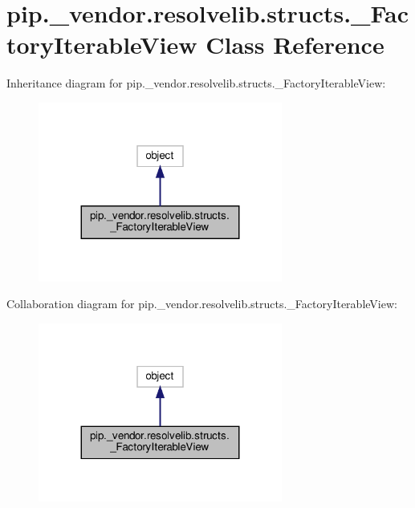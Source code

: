 \hypertarget{classpip_1_1__vendor_1_1resolvelib_1_1structs_1_1__FactoryIterableView}{}\section{pip.\+\_\+vendor.\+resolvelib.\+structs.\+\_\+\+Factory\+Iterable\+View Class Reference}
\label{classpip_1_1__vendor_1_1resolvelib_1_1structs_1_1__FactoryIterableView}


Inheritance diagram for pip.\+\_\+vendor.\+resolvelib.\+structs.\+\_\+\+Factory\+Iterable\+View\+:
\nopagebreak
\begin{figure}[H]
\begin{center}
\leavevmode
\includegraphics[width=227pt]{classpip_1_1__vendor_1_1resolvelib_1_1structs_1_1__FactoryIterableView__inherit__graph}
\end{center}
\end{figure}


Collaboration diagram for pip.\+\_\+vendor.\+resolvelib.\+structs.\+\_\+\+Factory\+Iterable\+View\+:
\nopagebreak
\begin{figure}[H]
\begin{center}
\leavevmode
\includegraphics[width=227pt]{classpip_1_1__vendor_1_1resolvelib_1_1structs_1_1__FactoryIterableView__coll__graph}
\end{center}
\end{figure}
